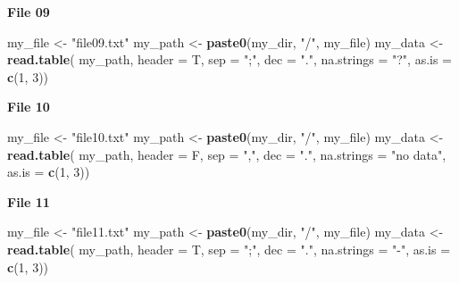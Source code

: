 \documentclass[]{book}
\newenvironment{Shaded}{\begin{snugshade}}{\end{snugshade}}
\newcommand{\DataTypeTok}[1]{\textcolor[rgb]{0.13,0.29,0.53}{#1}}
\newcommand{\DecValTok}[1]{\textcolor[rgb]{0.00,0.00,0.81}{#1}}
\newcommand{\KeywordTok}[1]{\textcolor[rgb]{0.13,0.29,0.53}{\textbf{#1}}}
\newcommand{\NormalTok}[1]{#1}
\newcommand{\StringTok}[1]{\textcolor[rgb]{0.31,0.60,0.02}{#1}}
\begin{document}
\textbf{File 09}

\begin{Shaded}
\begin{Highlighting}[]
\NormalTok{my_file <-}\StringTok{ "file09.txt"}
\NormalTok{my_path <-}\StringTok{ }\KeywordTok{paste0}\NormalTok{(my_dir, }\StringTok{"/"}\NormalTok{, my_file)}
\NormalTok{my_data <-}\StringTok{ }\KeywordTok{read.table}\NormalTok{(}
\NormalTok{    my_path,}
    \DataTypeTok{header =}\NormalTok{ T,}
    \DataTypeTok{sep =} \StringTok{";"}\NormalTok{,}
    \DataTypeTok{dec =} \StringTok{"."}\NormalTok{,}
    \DataTypeTok{na.strings =} \StringTok{"?"}\NormalTok{,}
    \DataTypeTok{as.is =} \KeywordTok{c}\NormalTok{(}\DecValTok{1}\NormalTok{, }\DecValTok{3}\NormalTok{))}
\end{Highlighting}
\end{Shaded}

\textbf{File 10}

\begin{Shaded}
\begin{Highlighting}[]
\NormalTok{my_file <-}\StringTok{ "file10.txt"}
\NormalTok{my_path <-}\StringTok{ }\KeywordTok{paste0}\NormalTok{(my_dir, }\StringTok{"/"}\NormalTok{, my_file)}
\NormalTok{my_data <-}\StringTok{ }\KeywordTok{read.table}\NormalTok{(}
\NormalTok{    my_path,}
    \DataTypeTok{header =}\NormalTok{ F,}
    \DataTypeTok{sep =} \StringTok{","}\NormalTok{,}
    \DataTypeTok{dec =} \StringTok{"."}\NormalTok{,}
    \DataTypeTok{na.strings =} \StringTok{"no data"}\NormalTok{,}
    \DataTypeTok{as.is =} \KeywordTok{c}\NormalTok{(}\DecValTok{1}\NormalTok{, }\DecValTok{3}\NormalTok{))}
\end{Highlighting}
\end{Shaded}

\textbf{File 11}

\begin{Shaded}
\begin{Highlighting}[]
\NormalTok{my_file <-}\StringTok{ "file11.txt"}
\NormalTok{my_path <-}\StringTok{ }\KeywordTok{paste0}\NormalTok{(my_dir, }\StringTok{"/"}\NormalTok{, my_file)}
\NormalTok{my_data <-}\StringTok{ }\KeywordTok{read.table}\NormalTok{(}
\NormalTok{    my_path,}
    \DataTypeTok{header =}\NormalTok{ T,}
    \DataTypeTok{sep =} \StringTok{";"}\NormalTok{,}
    \DataTypeTok{dec =} \StringTok{"."}\NormalTok{,}
    \DataTypeTok{na.strings =} \StringTok{"-"}\NormalTok{,}
    \DataTypeTok{as.is =} \KeywordTok{c}\NormalTok{(}\DecValTok{1}\NormalTok{, }\DecValTok{3}\NormalTok{))}
\end{Highlighting}
\end{Shaded}
\end{document}
